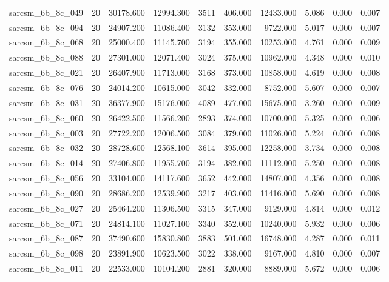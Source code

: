 \begin{tabular}{lrrrrrrrrr}
sarcsm\_6b\_8c\_049 & 20 & 30178.600 & 12994.300 & 3511 & 406.000 & 12433.000 & 5.086 & 0.000 & 0.007 \\
sarcsm\_6b\_8c\_094 & 20 & 24907.200 & 11086.400 & 3132 & 353.000 & 9722.000 & 5.017 & 0.000 & 0.007 \\
sarcsm\_6b\_8c\_068 & 20 & 25000.400 & 11145.700 & 3194 & 355.000 & 10253.000 & 4.761 & 0.000 & 0.009 \\
sarcsm\_6b\_8c\_088 & 20 & 27301.000 & 12071.400 & 3024 & 375.000 & 10962.000 & 4.348 & 0.000 & 0.010 \\
sarcsm\_6b\_8c\_021 & 20 & 26407.900 & 11713.000 & 3168 & 373.000 & 10858.000 & 4.619 & 0.000 & 0.008 \\
sarcsm\_6b\_8c\_076 & 20 & 24014.200 & 10615.000 & 3042 & 332.000 & 8752.000 & 5.607 & 0.000 & 0.007 \\
sarcsm\_6b\_8c\_031 & 20 & 36377.900 & 15176.000 & 4089 & 477.000 & 15675.000 & 3.260 & 0.000 & 0.009 \\
sarcsm\_6b\_8c\_060 & 20 & 26422.500 & 11566.200 & 2893 & 374.000 & 10700.000 & 5.325 & 0.000 & 0.006 \\
sarcsm\_6b\_8c\_003 & 20 & 27722.200 & 12006.500 & 3084 & 379.000 & 11026.000 & 5.224 & 0.000 & 0.008 \\
sarcsm\_6b\_8c\_032 & 20 & 28728.600 & 12568.100 & 3614 & 395.000 & 12258.000 & 3.734 & 0.000 & 0.008 \\
sarcsm\_6b\_8c\_014 & 20 & 27406.800 & 11955.700 & 3194 & 382.000 & 11112.000 & 5.250 & 0.000 & 0.008 \\
sarcsm\_6b\_8c\_056 & 20 & 33104.000 & 14117.600 & 3652 & 442.000 & 14807.000 & 4.356 & 0.000 & 0.008 \\
sarcsm\_6b\_8c\_090 & 20 & 28686.200 & 12539.900 & 3217 & 403.000 & 11416.000 & 5.690 & 0.000 & 0.008 \\
sarcsm\_6b\_8c\_027 & 20 & 25464.200 & 11306.500 & 3315 & 347.000 & 9129.000 & 4.814 & 0.000 & 0.012 \\
sarcsm\_6b\_8c\_071 & 20 & 24814.100 & 11027.100 & 3340 & 352.000 & 10240.000 & 5.932 & 0.000 & 0.006 \\
sarcsm\_6b\_8c\_087 & 20 & 37490.600 & 15830.800 & 3883 & 501.000 & 16748.000 & 4.287 & 0.000 & 0.011 \\
sarcsm\_6b\_8c\_098 & 20 & 23891.900 & 10623.500 & 3022 & 338.000 & 9167.000 & 4.810 & 0.000 & 0.007 \\
sarcsm\_6b\_8c\_011 & 20 & 22533.000 & 10104.200 & 2881 & 320.000 & 8889.000 & 5.672 & 0.000 & 0.006 \\

\end{tabular}
